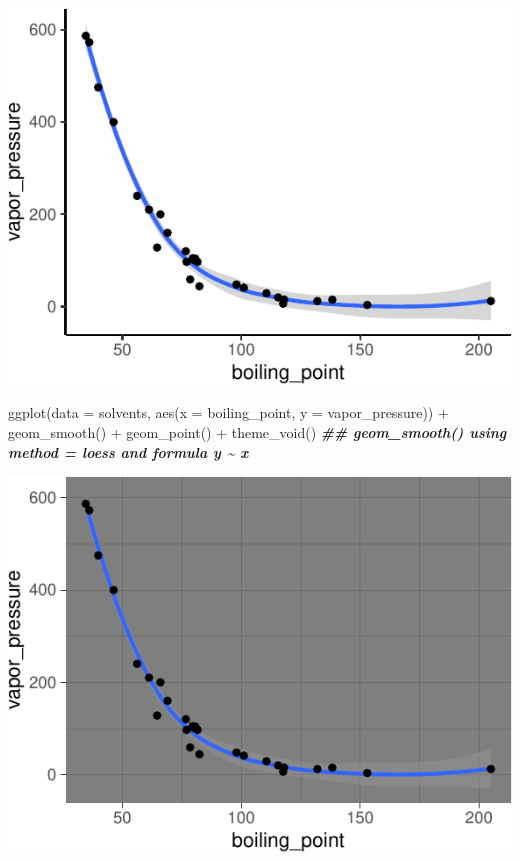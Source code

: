\documentclass[
]{krantz}
\newenvironment{Shaded}{\begin{snugshade}}{\end{snugshade}}
\newcommand{\AttributeTok}[1]{\textcolor[rgb]{0.77,0.63,0.00}{#1}}
\newcommand{\DocumentationTok}[1]{\textcolor[rgb]{0.56,0.35,0.01}{\textbf{\textit{#1}}}}
\newcommand{\FunctionTok}[1]{\textcolor[rgb]{0.00,0.00,0.00}{#1}}
\newcommand{\NormalTok}[1]{#1}
\newcommand{\SpecialCharTok}[1]{\textcolor[rgb]{0.00,0.00,0.00}{#1}}
\begin{document}
\begin{center}\includegraphics{index_files/figure-latex/unnamed-chunk-63-1} \end{center}

\begin{Shaded}
\begin{Highlighting}[]
\FunctionTok{ggplot}\NormalTok{(}\AttributeTok{data =}\NormalTok{ solvents, }\FunctionTok{aes}\NormalTok{(}\AttributeTok{x =}\NormalTok{ boiling\_point, }\AttributeTok{y =}\NormalTok{ vapor\_pressure)) }\SpecialCharTok{+} 
  \FunctionTok{geom\_smooth}\NormalTok{() }\SpecialCharTok{+}
  \FunctionTok{geom\_point}\NormalTok{() }\SpecialCharTok{+}
  \FunctionTok{theme\_void}\NormalTok{()}
\DocumentationTok{\#\# \textasciigrave{}geom\_smooth()\textasciigrave{} using method = \textquotesingle{}loess\textquotesingle{} and formula \textquotesingle{}y \textasciitilde{} x\textquotesingle{}}
\end{Highlighting}
\end{Shaded}

\begin{center}\includegraphics{index_files/figure-latex/unnamed-chunk-64-1} \end{center}
\end{document}
